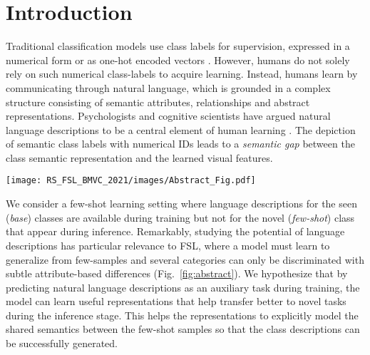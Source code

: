 \documentclass{bmvc2k}
\begin{document}
\section{Introduction}
Traditional classification models use class labels for supervision, expressed in a numerical form or as one-hot encoded vectors \cite{khan2018guide}. However, humans do not solely rely on such numerical class-labels to acquire learning. Instead, humans learn by communicating through natural language, which is grounded in a complex structure consisting of semantic attributes, relationships and abstract representations. Psychologists and cognitive scientists have argued natural language descriptions to be a central element of human learning \cite{smith2003learning,chin2017contrastive,miller2019explanation}. The depiction of semantic class labels with numerical IDs leads to a \emph{semantic gap} between the class semantic representation and the learned visual features.
\begin{SCfigure}[50]
    \caption{\small In FSL setting, where we require generalizability to novel classes with limited samples, modeling semantic attributes of classes can help disambiguate confusing classes. We suggest that the numerical class labels traditionally used in FSL are inadequate to represent diverse semantic attributes of an object class, which can be modeled via low-cost class-level language descriptions (colored boxes). Our approach effectively utilizes language information to learn both highly discriminative and transferable visual representations that help to avoid errors in ambiguous cases (e.g., visually similar fine-grained classes).}
    \texttt{[image: RS\_FSL\_BMVC\_2021/images/Abstract\_Fig.pdf]}
    \label{fig:abstract}
\end{SCfigure}

We consider a few-shot learning setting where language descriptions for the seen (\emph{base}) classes are available during training but not for the novel (\emph{few-shot}) class that appear during inference.  Remarkably, studying the potential of language descriptions has particular relevance to FSL, where a model must learn to generalize from few-samples and several categories can only be discriminated with subtle attribute-based differences (Fig.~\ref{fig:abstract}). We hypothesize that by predicting natural language descriptions as an auxiliary task during training, the model can learn useful representations that help transfer better to novel tasks during the inference stage. This helps the representations to explicitly model the shared semantics between the few-shot samples so that the class descriptions can be successfully generated. 
\end{document}
